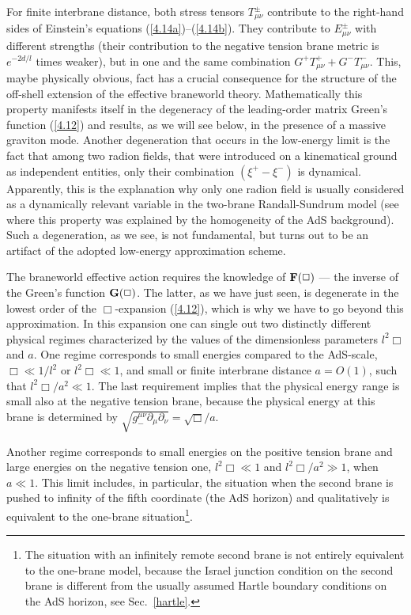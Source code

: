 \documentclass[a4paper,preprint,nofootinbib,
                 showpacs,preprintnumbers,amsmath,amssymb]{revtex4}
\begin{document}
For finite interbrane distance, both stress tensors 
$T_{\mu\nu}^\pm$ contribute to the right-hand sides of Einstein's 
equations (\ref{4.14a})--(\ref{4.14b}). They contribute to 
$E_{\mu\nu}^\pm$ with different strengths (their contribution to the 
negative tension brane metric is $e^{-2d/l}$ times weaker), but in 
one and the same combination $G^+T_{\mu\nu}^++G^-T_{\mu\nu}^-$. 
This, maybe physically obvious, fact has a crucial consequence for 
the structure of the off-shell extension of the effective 
braneworld theory. Mathematically this property manifests itself 
in the degeneracy of the leading-order matrix Green's function 
(\ref{4.12}) and results, as we will see below, in the presence of 
a massive graviton mode. Another degeneration that occurs in the 
low-energy limit is the fact that among 
two radion fields, that were introduced on a kinematical ground as 
independent entities, only their combination $(\xi^+-\xi^-)$ is 
dynamical. Apparently, this is the explanation why only one radion 
field is usually considered as a dynamically relevant variable in 
the two-brane Randall-Sundrum model (see \cite{GarPujTan} where 
this property was explained by the homogeneity of the AdS background). 
Such a degeneration, as we see, is not fundamental, but turns out 
to be an artifact of the adopted low-energy approximation scheme. 
 
The braneworld effective action requires the knowledge of ${\bf 
F}(\Box)$ --- the inverse of the Green's function ${\bf G}(\Box)$. 
The latter, as we have just seen, is degenerate in the lowest 
order of the $\Box$-expansion (\ref{4.12}), which is why we have to 
go beyond this approximation. In this expansion one can single out 
two distinctly different physical regimes characterized by the 
values of the dimensionless parameters $l^2\Box$ and $a$. One 
regime corresponds to small energies compared to the AdS-scale, 
$\Box\ll 1/l^2$ or $l^2\Box\ll 1$, and small or finite interbrane 
distance $a=O(1)$, such that $l^2\Box/a^2\ll 1$. The last 
requirement implies that the physical energy range is small also 
at the negative tension brane, because the physical energy at  
this brane is determined by 
$\sqrt{g^{\mu\nu}_-\partial_\mu\partial_\nu}=\sqrt\Box/a$. 
 
Another regime corresponds to small energies on the positive 
tension brane and large energies on the negative tension one, 
$l^2\Box\ll 1$ and $l^2\Box/a^2\gg 1$, when $a\ll 1$. This limit 
includes, in particular, the situation when the second brane is 
pushed to infinity of the fifth coordinate (the AdS horizon) and 
qualitatively is equivalent to the one-brane 
situation\footnote{The situation with an infinitely remote second 
brane is not entirely equivalent to the one-brane model, because 
the Israel junction condition on the second brane is different 
from the usually assumed Hartle boundary conditions on the AdS 
horizon, see Sec.~\ref{hartle}.}. 
 
\end{document}

